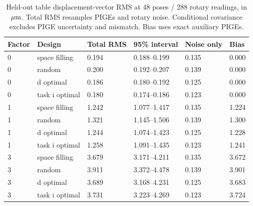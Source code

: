 \begin{table}[H]\centering\small
\begin{tabular}{llllll}\toprule
Factor & Design & Total RMS & 95\% interval & Noise only & Bias\\\midrule
0 & space filling & 0.194 & 0.188--0.199 & 0.135 & 0.000\\
0 & random & 0.200 & 0.192--0.207 & 0.139 & 0.000\\
0 & d optimal & 0.186 & 0.180--0.192 & 0.125 & 0.000\\
0 & task i optimal & 0.180 & 0.174--0.186 & 0.123 & 0.000\\
1 & space filling & 1.242 & 1.077--1.417 & 0.135 & 1.224\\
1 & random & 1.321 & 1.145--1.506 & 0.139 & 1.300\\
1 & d optimal & 1.244 & 1.074--1.423 & 0.125 & 1.228\\
1 & task i optimal & 1.258 & 1.091--1.435 & 0.123 & 1.241\\
3 & space filling & 3.679 & 3.171--4.211 & 0.135 & 3.672\\
3 & random & 3.911 & 3.372--4.478 & 0.139 & 3.901\\
3 & d optimal & 3.689 & 3.168--4.231 & 0.125 & 3.683\\
3 & task i optimal & 3.731 & 3.223--4.269 & 0.123 & 3.724\\
\bottomrule\end{tabular}\caption{Held-out table displacement-vector RMS at 48 poses / 288 rotary readings, in $\mu\mathrm{m}$. Total RMS resamples PIGEs and rotary noise. Conditional covariance excludes PIGE uncertainty and mismatch. Bias uses exact auxiliary PIGEs.}\label{tab:publication_design_table}\end{table}

